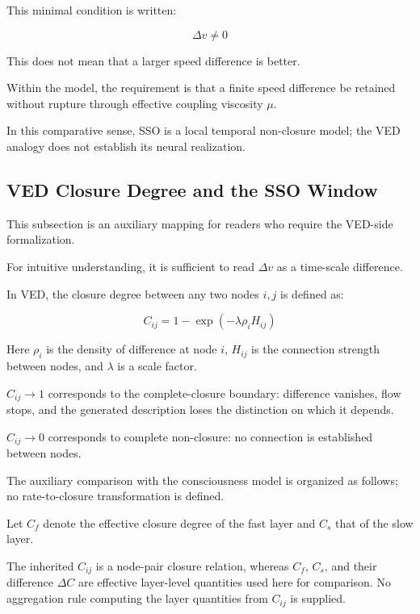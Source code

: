 This minimal condition is written:

\begin{equation}
\Delta v \neq 0
\end{equation}

This does not mean that a larger speed difference is better.

Within the model, the requirement is that a finite speed difference be retained without rupture through effective coupling viscosity $\mu$.

In this comparative sense, SSO is a local temporal non-closure model; the VED analogy does not establish its neural realization.

\subsection{VED Closure Degree and the SSO Window}


This subsection is an auxiliary mapping for readers who require the VED-side formalization.

For intuitive understanding, it is sufficient to read $\Delta v$ as a time-scale difference.

In VED, the closure degree between any two nodes $i, j$ is defined as:

\begin{equation}
C_{ij} = 1 - \exp\!\left(-\lambda \rho_i H_{ij}\right)
\end{equation}

Here $\rho_i$ is the density of difference at node $i$, $H_{ij}$ is the connection strength between nodes, and $\lambda$ is a scale factor.

$C_{ij} \to 1$ corresponds to the complete-closure boundary: difference vanishes, flow stops, and the generated description loses the distinction on which it depends.

$C_{ij} \to 0$ corresponds to complete non-closure: no connection is established between nodes.

The auxiliary comparison with the consciousness model is organized as follows; no rate-to-closure transformation is defined.

Let $C_f$ denote the effective closure degree of the fast layer and $C_s$ that of the slow layer.

The inherited $C_{ij}$ is a node-pair closure relation, whereas $C_f$, $C_s$, and their difference $\Delta C$ are effective layer-level quantities used here for comparison. No aggregation rule computing the layer quantities from $C_{ij}$ is supplied.

